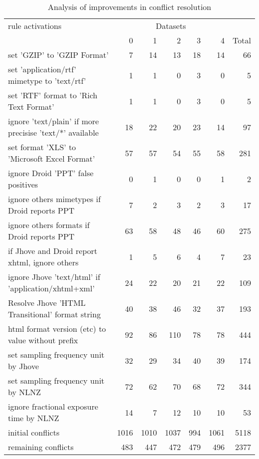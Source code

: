 \documentclass[a4paper,12pt]{article}
\begin{document}
\begin{table}[ht]
\begin{center}
\begin{tabular}[h]{l||r|r|r|r|r||r}
rule activations &  \multicolumn{5}{c}{Datasets} \\
        & 0 & 1 & 2 & 3 & 4 & Total \\
\hline
set 'GZIP' to 'GZIP Format' & 7 & 14 & 13 & 18 & 14 & 66\\
set 'application/rtf' mimetype to 'text/rtf' & 1 & 1 & 0 & 3 & 0 & 5\\
set 'RTF' format to 'Rich Text Format' & 1 & 1 & 0 & 3 & 0 & 5\\
ignore 'text/plain' if more precisise 'text/*' available & 18 & 22 & 20 & 23 & 14 & 97\\
set format 'XLS' to 'Microsoft Excel Format' & 57 & 57 & 54 & 55 & 58 & 281\\
ignore Droid 'PPT' false positives & 0 & 1 & 0 & 0 & 1 & 2\\
ignore others mimetypes if Droid reports PPT & 7 & 2 & 3 & 2 & 3 & 17\\
ignore others formats if Droid reports PPT & 63 & 58 & 48 & 46 & 60 & 275\\
if Jhove and Droid report xhtml, ignore others & 1 & 5 & 6 & 4 & 7 & 23\\
ignore Jhove 'text/html' if 'application/xhtml+xml' & 24 & 22 & 20 & 21 & 22 & 109\\
Resolve Jhove 'HTML Transitional' format string & 40 & 38 & 46 & 32 & 37 & 193\\
html format version (etc) to value without prefix & 92 & 86 & 110 & 78 & 78 & 444\\
set sampling frequency unit by Jhove & 32 & 29 & 34 & 40 & 39 & 174\\
set sampling frequency unit by NLNZ & 72 & 62 & 70 & 68 & 72 & 344\\
ignore fractional exposure time by NLNZ & 14 & 7 & 12 & 10 & 10 & 53\\
\hline
initial conflicts & 1016 & 1010	& 1037 & 994 &1061 & 5118 \\
\hline
remaining conflicts & 483 &	447	& 472 &	479	& 496 &	2377

\end{tabular}
\end{center}
\caption{Analysis of improvements in conflict resolution}
\label{tab:conflicts}
\end{table}
\end{document}
